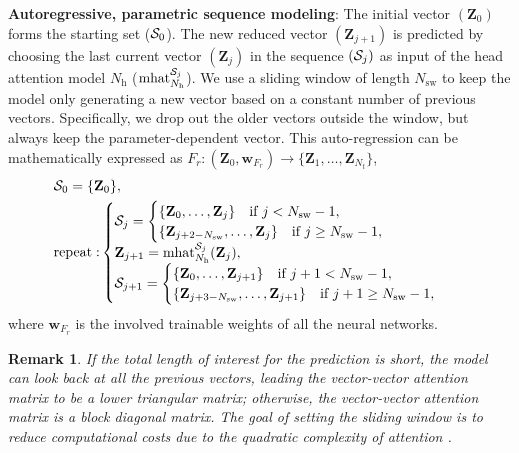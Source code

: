 \documentclass{article}
\newtheorem{remark}{Remark}
\begin{document}
\textbf{Autoregressive, parametric sequence modeling}: The initial vector $(\mathbf{Z}_0)$ forms the starting set ($\mathcal{S}_0$). The new reduced vector $(\mathbf{Z}_{j+1})$ is predicted by choosing the last current vector $(\mathbf{Z}_{j})$ in the sequence $(\mathcal{S}_j)$ as input of the head attention model $N_\mathrm{h}$ ($\mathrm{mhat}_{N_\mathrm{h}}^{\mathcal{S}_j}$). We use a sliding window of length $N_\mathrm{sw}$ to keep the model only generating a new vector based on a constant number of previous vectors. Specifically, we drop out the older vectors outside the window, but always keep the parameter-dependent vector. This auto-regression can be mathematically expressed as $F_r:(\mathbf{Z}_0, \mathbf{w}_{F_r})\rightarrow \{\mathbf{Z}_1,\dots,\mathbf{Z}_{N_t}\}$,
\begin{equation}
\begin{split}
&\mathcal{S}_0 = \{\mathbf{Z}_0\}, \\
&\mathrm{repeat:}\begin{cases}
\mathcal{S}_j =\begin{cases}
\{ \mathbf{Z}_0,\dots,\mathbf{Z}_j \}\quad\text{if } j< N_{\mathrm{sw}}-1,\\
\{ \mathbf{Z}_{j+2-N_{\mathrm{sw}}},\dots,\mathbf{Z}_j \} \quad\text{if } j\geq N_{\mathrm{sw}}-1,
\end{cases}
\\
\mathbf{Z}_{j+1}=\mathrm{mhat}^{\mathcal{S}_j}_{N_\mathrm{h}}(\mathbf{Z}_j),\\
    \mathcal{S}_{j+1} = \begin{cases}
\{ \mathbf{Z}_0,\dots,\mathbf{Z}_{j+1} \}\quad\text{if } j+1< N_{\mathrm{sw}}-1,\\
\{ \mathbf{Z}_{j+3-N_{\mathrm{sw}}},\dots,\mathbf{Z}_{j+1} \} \quad\text{if } j+1\geq N_{\mathrm{sw}}-1,
\end{cases}
\end{cases}
\end{split}
\end{equation}
where $\mathbf{w}_{F_r}$ is the involved trainable weights of all the neural networks.
\begin{remark}
If the total length of interest for the prediction is short, the model can look back at all the previous vectors, leading the vector-vector attention matrix to be a lower triangular matrix; otherwise, the vector-vector attention matrix is a block diagonal matrix. The goal of setting the sliding window is to reduce computational costs due to the quadratic complexity of attention \cite{vaswani2017attention}.
\end{remark}
\end{document}
